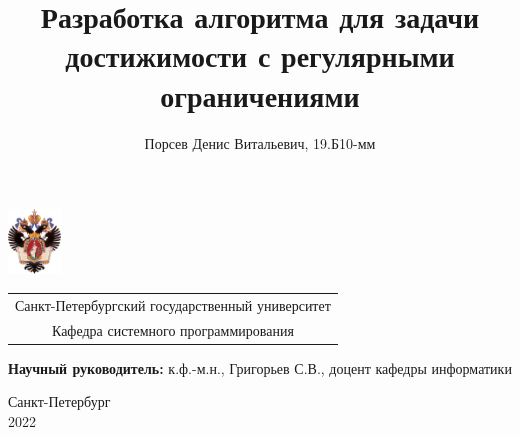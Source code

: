 \documentclass{beamer}
\title[Разработка алгоритма RPQ]{Разработка алгоритма для задачи достижимости с регулярными ограничениями}
\institute[СПбГУ]{}
\author[Денис Порсев]{Порсев Денис Витальевич, 19.Б10-мм}
\begin{document}
{
\begin{frame}
  \includegraphics[width=1.4cm]{pictures/SPbGU_Logo.png}
\vspace{-35pt}
\hspace{-10pt}
\begin{center}
   \begin{tabular}{c}
        \scriptsize{Санкт-Петербургский государственный университет} \\
        \scriptsize{Кафедра системного программирования}
    \end{tabular}
\titlepage
\end{center}

\btVFill

{\scriptsize
   {\bfseries Научный руководитель:} к.ф.-м.н., Григорьев С.В., доцент кафедры информатики \\
 }
\begin{center}
  \vspace{5pt}
  \scriptsize{Санкт-Петербург\\
                 2022}
  \end{center}

\end{frame}
}
\end{document}
